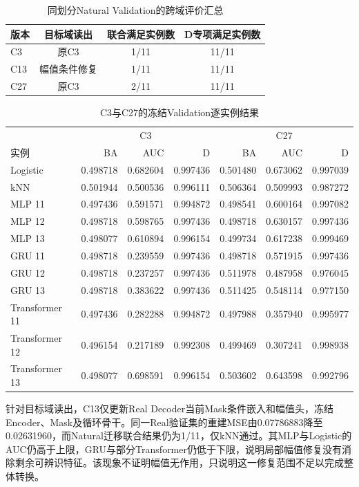 \begin{table}[htbp]
 \centering\small
 \caption{同划分Natural Validation的跨域评价汇总}
 \label{tab:ch05_transfer_summary}
 \begin{tabular}{lccc}
 \hline
 版本&目标域读出&联合满足实例数&D专项满足实例数\\\hline
 C3&原C3&1/11&11/11\\
 C13&幅值条件修复&1/11&11/11\\
 C27&原C3&2/11&11/11\\\hline
 \end{tabular}
\end{table}
\begin{table}[htbp]
 \centering\footnotesize
 \caption{C3与C27的冻结Validation逐实例结果}
 \label{tab:ch05_validation_instances}
 \begin{tabular}{lrrrrrr}
 \hline
 &\multicolumn{3}{c}{C3}&\multicolumn{3}{c}{C27}\\
 实例&BA&AUC&D&BA&AUC&D\\\hline
Logistic&0.498718&0.682604&0.997436&0.501480&0.673062&0.997039\\
kNN&0.501944&0.500536&0.996111&0.506364&0.509993&0.987272\\
MLP 11&0.497436&0.591571&0.994872&0.498541&0.600164&0.997082\\
MLP 12&0.498718&0.598765&0.997436&0.498718&0.630157&0.997436\\
MLP 13&0.498077&0.610894&0.996154&0.499734&0.617238&0.999469\\
GRU 11&0.498718&0.239559&0.997436&0.498718&0.571915&0.997436\\
GRU 12&0.498718&0.237257&0.997436&0.511978&0.487958&0.976045\\
GRU 13&0.498718&0.383622&0.997436&0.511425&0.548114&0.977150\\
Transformer 11&0.497436&0.282288&0.994872&0.497988&0.357940&0.995977\\
Transformer 12&0.496154&0.217189&0.992308&0.499469&0.307241&0.998938\\
Transformer 13&0.498077&0.698591&0.996154&0.503602&0.643598&0.992796\\
 \hline
 \end{tabular}
\end{table}

针对目标域读出，C13仅更新Real Decoder当前Mask条件嵌入和幅值头，冻结Encoder、Mask及循环骨干。同一Real验证集的重建MSE由0.07786883降至0.02631960，而Natural迁移联合结果仍为1/11，仅kNN通过。其MLP与Logistic的AUC仍高于上限，GRU与部分Transformer仍低于下限，说明局部幅值修复没有消除剩余可辨识特征。该现象不证明幅值无作用，只说明这一修复范围不足以完成整体转换。

